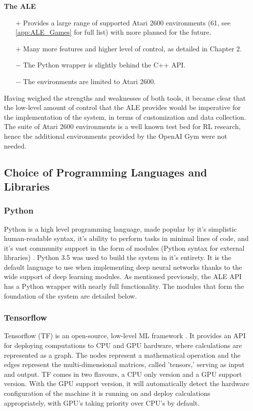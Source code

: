 \textbf{The ALE}
\begin{itemize}
	\item[$+$] Provides a large range of supported Atari 2600 environments (61, see \ref{app:ALE_Games} for full list) with more planned for the future.
	\item[$+$] Many more features and higher level of control, as detailed in Chapter 2.
	\item[$-$] The Python wrapper is slightly behind the C++ API.
	\item[$-$] The environments are limited to Atari 2600.
\end{itemize}

Having weighed the strengths and weaknesses of both tools, it became clear that the low-level amount of control that the ALE provides would be imperative for the implementation of the system, in terms of customization and data collection. The suite of Atari 2600 environments is a well known test bed for RL research, hence the additional environments provided by the OpenAI Gym were not needed.

\subsection{Choice of Programming Languages and Libraries}
\subsubsection{Python}
Python is a high level programming language, made popular by it's simplistic human-readable syntax, it's ability to perform tasks in minimal lines of code, and it's vast community support in the form of modules (Python syntax for external libraries) \cite{python}. Python 3.5 was used to build the system in it's entirety. It is the default language to use when implementing deep neural networks thanks to the wide support of deep learning modules. As mentioned previously, the ALE API has a Python wrapper with nearly full functionality. The modules that form the foundation of the system are detailed below.

\subsubsection{Tensorflow}
Tensorflow (TF) is an open-source, low-level ML framework \cite{tf}. It provides an API for deploying computations to CPU and GPU hardware, where calculations are represented as a graph. The nodes represent a mathematical operation and the edges represent the multi-dimensional matrices, called 'tensors,' serving as input and output. TF comes in two flavours, a CPU only version and a GPU support version. With the GPU support version, it will automatically detect the hardware configuration of the machine it is running on and deploy calculations appropriately, with GPU's taking priority over CPU's by default.

